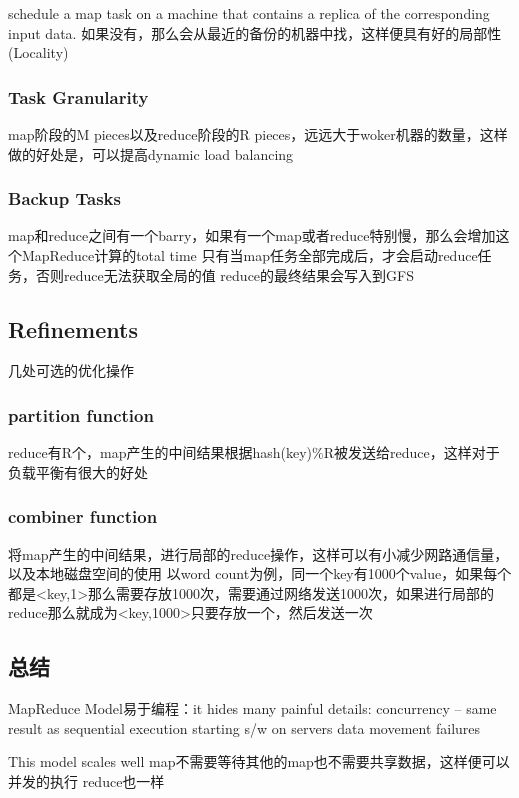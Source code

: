 schedule a map task on a machine that contains a replica of the corresponding input data.
如果没有，那么会从最近的备份的机器中找，这样便具有好的局部性(Locality)

\subsubsection{Task Granularity}
map阶段的M pieces以及reduce阶段的R pieces，远远大于woker机器的数量，这样做的好处是，可以提高dynamic load balancing

\subsubsection{Backup Tasks}
map和reduce之间有一个barry，如果有一个map或者reduce特别慢，那么会增加这个MapReduce计算的total time
只有当map任务全部完成后，才会启动reduce任务，否则reduce无法获取全局的值
reduce的最终结果会写入到GFS

\subsection{Refinements}
几处可选的优化操作
\subsubsection{partition function}
reduce有R个，map产生的中间结果根据hash(key)\%R被发送给reduce，这样对于负载平衡有很大的好处

\subsubsection{combiner function}
将map产生的中间结果，进行局部的reduce操作，这样可以有小减少网路通信量，以及本地磁盘空间的使用
以word count为例，同一个key有1000个value，如果每个都是<key,1>那么需要存放1000次，需要通过网络发送1000次，如果进行局部的reduce那么就成为<key,1000>只要存放一个，然后发送一次

\subsection{总结}
MapReduce Model易于编程：it hides many painful details:
concurrency -- same result as sequential execution
starting s/w on servers
data movement
failures

This model scales well
map不需要等待其他的map也不需要共享数据，这样便可以并发的执行
reduce也一样

